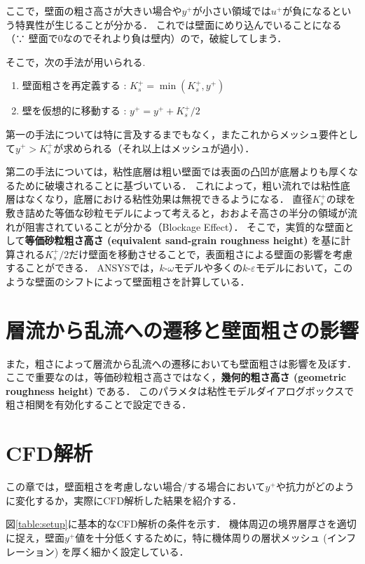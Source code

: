 \documentclass[uplatex,dvipdfmx,a4j,12pt]{jsarticle}
\begin{document}
ここで，壁面の粗さ高さが大きい場合や$y^+$が小さい領域では$u^+$が負になるという特異性が生じることが分かる． 
これでは壁面にめり込んでいることになる（∵ 壁面で0なのでそれより負は壁内）ので，破綻してしまう．

そこで，次の手法が用いられる.

\begin{enumerate}
  \item 壁面粗さを再定義する : $K_s^+ = \min(K_s^+, y^+)$
  \item 壁を仮想的に移動する : $y^+ = y^+ + K_s^+ / 2$
\end{enumerate}

第一の手法については特に言及するまでもなく，またこれからメッシュ要件として$y^+ > K_s^+$が求められる（それ以上はメッシュが過小）．

第二の手法については，粘性底層は粗い壁面では表面の凸凹が底層よりも厚くなるために破壊されることに基づいている．
これによって，粗い流れでは粘性底層はなくなり，底層における粘性効果は無視できるようになる．
直径$K_s^+$の球を敷き詰めた等価な砂粒モデルによって考えると，おおよそ高さの半分の領域が流れが阻害されていることが分かる（Blockage Effect）．
そこで，実質的な壁面として\textbf{等価砂粒粗さ高さ (equivalent sand-grain roughness height)} を基に計算される$K_s^+ / 2$だけ壁面を移動させることで，表面粗さによる壁面の影響を考慮することができる．
ANSYSでは，$k$-$\omega$モデルや多くの$k$-$\varepsilon$モデルにおいて，このような壁面のシフトによって壁面粗さを計算している．

\section{層流から乱流への遷移と壁面粗さの影響}

また，粗さによって層流から乱流への遷移においても壁面粗さは影響を及ぼす．
ここで重要なのは，等価砂粒粗さ高さではなく，\textbf{幾何的粗さ高さ (geometric roughness height)} である．
このパラメタは粘性モデルダイアログボックスで粗さ相関を有効化することで設定できる．


\section{CFD解析}
この章では，壁面粗さを考慮しない場合/する場合において$y^+$や抗力がどのように変化するか，実際にCFD解析した結果を紹介する．

図\ref{table:setup}に基本的なCFD解析の条件を示す．
機体周辺の境界層厚さを適切に捉え，壁面$y^+$値を十分低くするために，特に機体周りの層状メッシュ (インフレーション) を厚く細かく設定している．
\end{document}
